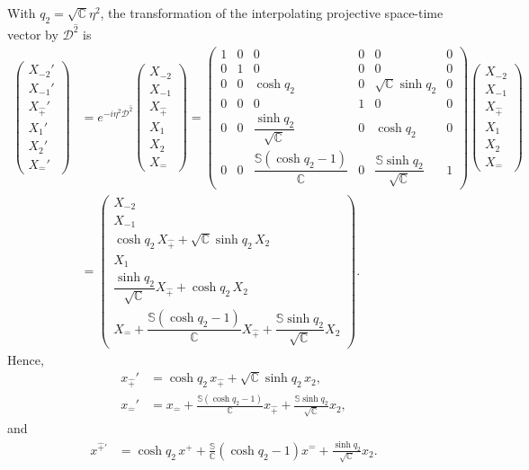 \documentclass[foundations,article,submit,pdftex,moreauthors]{Definitions/mdpi}
\begin{document}
With $q_2=\sqrt{\mathbb{C}}\eta^{2}$, the transformation of the interpolating
projective space-time vector by $\mathcal{D}^{\hat{2}}$ is
\begin{align}
\begin{pmatrix}
X_{-2}'\\ X_{-1}'\\ X_{\hat{+}}'\\ X_1'\\ X_2'\\ X_{\hat{-}}'
\end{pmatrix}
&=e^{-i\eta^{2}\mathcal{D}^{\hat{2}}}
\begin{pmatrix}
X_{-2}\\ X_{-1}\\ X_{\hat{+}}\\ X_1\\ X_2\\ X_{\hat{-}}
\end{pmatrix}
=\begin{pmatrix}
1 & 0 & 0 & 0 & 0 & 0\\
0 & 1 & 0 & 0 & 0 & 0\\
0 & 0 & \cosh q_2 & 0 & \sqrt{\mathbb{C}}\sinh q_2 & 0\\
0 & 0 & 0 & 1 & 0 & 0\\
0 & 0 & \dfrac{\sinh q_2}{\sqrt{\mathbb{C}}} & 0 & \cosh q_2 & 0\\
0 & 0 & \dfrac{\mathbb{S}(\cosh q_2-1)}{\mathbb{C}} & 0 & \dfrac{\mathbb{S}\sinh q_2}{\sqrt{\mathbb{C}}} & 1\label{A104}
\end{pmatrix}
\begin{pmatrix}
X_{-2}\\ X_{-1}\\ X_{\hat{+}}\\ X_1\\ X_2\\ X_{\hat{-}}
\end{pmatrix}\\
&=\begin{pmatrix}
X_{-2}\\ X_{-1}\\
\cosh q_2\,X_{\hat{+}}+\sqrt{\mathbb{C}}\sinh q_2\,X_2\\
X_1\\
\dfrac{\sinh q_2}{\sqrt{\mathbb{C}}}X_{\hat{+}}+\cosh q_2\,X_2\\
X_{\hat{-}}+\dfrac{\mathbb{S}(\cosh q_2-1)}{\mathbb{C}}X_{\hat{+}}
+\dfrac{\mathbb{S}\sinh q_2}{\sqrt{\mathbb{C}}}X_2 
\end{pmatrix}.
\end{align}
Hence,
\begin{align}
x_{\hat{+}}'&=\cosh q_2\,x_{\hat{+}}
 +\sqrt{\mathbb{C}}\sinh q_2\,x_2, \nonumber\\
x_{\hat{-}}'&=x_{\hat{-}}
 +\frac{\mathbb{S}(\cosh q_2-1)}{\mathbb{C}}x_{\hat{+}}
 +\frac{\mathbb{S}\sinh q_2}{\sqrt{\mathbb{C}}}x_2,
\end{align}
and
\begin{align}
x^{\hat{+}\prime}
&=\cosh q_2\,x^{\hat{+}}
 +\frac{\mathbb{S}}{\mathbb{C}}\left(\cosh q_2-1\right)x^{\hat{-}}
 +\frac{\sinh q_2}{\sqrt{\mathbb{C}}}x_2.
\end{align}
\end{document}
